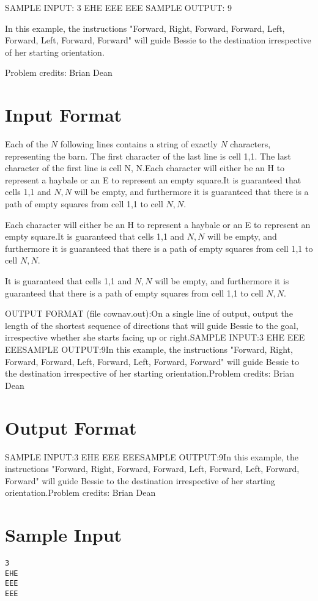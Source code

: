 \documentclass[12pt]{article}
\begin{document}
SAMPLE INPUT:
3
EHE
EEE
EEE
SAMPLE OUTPUT: 
9

In this example, the instructions "Forward, Right, Forward, Forward, Left,
Forward, Left, Forward, Forward" will guide Bessie to the destination
irrespective of her starting orientation.


Problem credits: Brian Dean



\section*{Input Format}
Each of the $N$ following lines contains a string of exactly $N$ characters,
representing the barn. The first character of the last line is cell 1,1. The
last character of the first line is cell N, N.Each character will either be an H to represent a haybale or an E to represent
an empty square.It is guaranteed that cells 1,1 and $N,N$ will be empty, and furthermore it is
guaranteed that there is a path of empty squares from cell 1,1 to cell $N, N$.

Each character will either be an H to represent a haybale or an E to represent
an empty square.It is guaranteed that cells 1,1 and $N,N$ will be empty, and furthermore it is
guaranteed that there is a path of empty squares from cell 1,1 to cell $N, N$.

It is guaranteed that cells 1,1 and $N,N$ will be empty, and furthermore it is
guaranteed that there is a path of empty squares from cell 1,1 to cell $N, N$.

OUTPUT FORMAT (file cownav.out):On a single line of output, output the length of the shortest sequence of
directions that will guide Bessie to the goal, irrespective whether she starts
facing up or right.SAMPLE INPUT:3
EHE
EEE
EEESAMPLE OUTPUT:9In this example, the instructions "Forward, Right, Forward, Forward, Left,
Forward, Left, Forward, Forward" will guide Bessie to the destination
irrespective of her starting orientation.Problem credits: Brian Dean

\section*{Output Format}
SAMPLE INPUT:3
EHE
EEE
EEESAMPLE OUTPUT:9In this example, the instructions "Forward, Right, Forward, Forward, Left,
Forward, Left, Forward, Forward" will guide Bessie to the destination
irrespective of her starting orientation.Problem credits: Brian Dean

\section*{Sample Input}
\begin{verbatim}
3
EHE
EEE
EEE
\end{verbatim}
\end{document}
